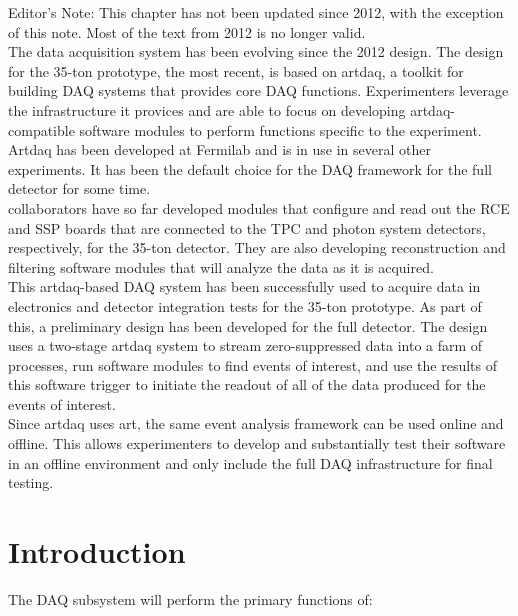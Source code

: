 \begin{editornote}
Editor's Note: This chapter has not been updated since 2012, with the exception of this note.  Most of the
text from 2012 is no longer valid. \\

The data acquisition system has been evolving since the 2012 design. The design for the 35-ton prototype, the most recent,
 is based on artdaq, a toolkit for building DAQ systems that provides core DAQ functions. Experimenters leverage the infrastructure it provices and are able to focus on developing artdaq-compatible software modules to perform functions specific to the experiment. \\ 

Artdaq has been developed at Fermilab and is in use in several other experiments.  It has been the default choice for the DAQ framework for the full \LBNE detector for some time. \\ 

\LBNE collaborators have so far developed modules that configure and read out the RCE and SSP boards that are connected to the TPC and photon system detectors, respectively, for the 35-ton detector.  They are also developing reconstruction and filtering software modules that will analyze the data as it is acquired.  \\ 

This artdaq-based DAQ system %
has been successfully used to acquire data in electronics and detector integration tests for the 35-ton prototype.   As part of this, a preliminary design has been developed for the full detector. The design uses a two-stage artdaq system to stream zero-suppressed data into a farm of processes, run software modules to find events of interest, and use the results of this software trigger to initiate the readout of all of the data produced for the events of interest. \\ 

Since artdaq uses art, the same event analysis framework can be used
online and offline.  This allows experimenters to develop and
substantially test their software in an offline environment and only
include the full DAQ infrastructure for final testing.
\end{editornote}

\section{Introduction}
The DAQ subsystem will perform the primary functions of:

